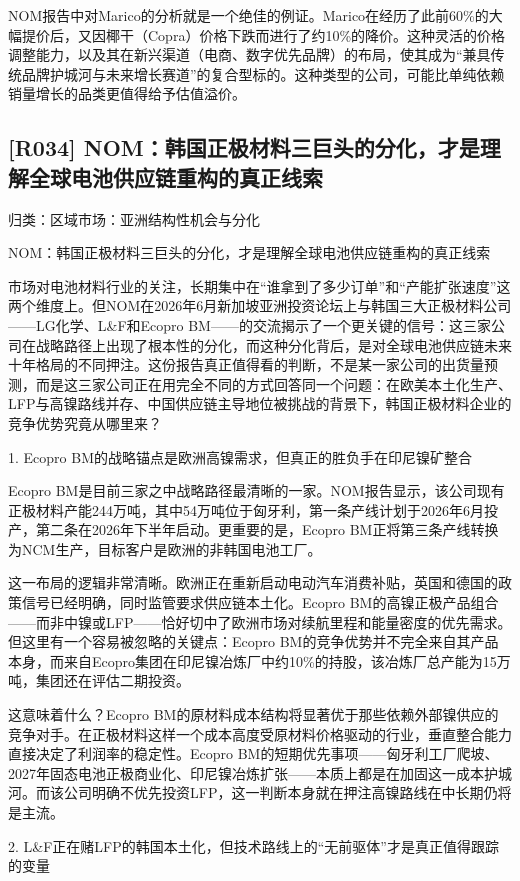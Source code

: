 \documentclass[11pt]{ctexart}
\begin{document}
NOM报告中对Marico的分析就是一个绝佳的例证。Marico在经历了此前60\%的大幅提价后，又因椰干（Copra）价格下跌而进行了约10\%的降价。这种灵活的价格调整能力，以及其在新兴渠道（电商、数字优先品牌）的布局，使其成为“兼具传统品牌护城河与未来增长赛道”的复合型标的。这种类型的公司，可能比单纯依赖销量增长的品类更值得给予估值溢价。

\subsection{[R034] NOM：韩国正极材料三巨头的分化，才是理解全球电池供应链重构的真正线索}
{\small\color{refgray}归类：区域市场：亚洲结构性机会与分化}

NOM：韩国正极材料三巨头的分化，才是理解全球电池供应链重构的真正线索

市场对电池材料行业的关注，长期集中在“谁拿到了多少订单”和“产能扩张速度”这两个维度上。但NOM在2026年6月新加坡亚洲投资论坛上与韩国三大正极材料公司——LG化学、L\&F和Ecopro BM——的交流揭示了一个更关键的信号：这三家公司在战略路径上出现了根本性的分化，而这种分化背后，是对全球电池供应链未来十年格局的不同押注。这份报告真正值得看的判断，不是某一家公司的出货量预测，而是这三家公司正在用完全不同的方式回答同一个问题：在欧美本土化生产、LFP与高镍路线并存、中国供应链主导地位被挑战的背景下，韩国正极材料企业的竞争优势究竟从哪里来？

1. Ecopro BM的战略锚点是欧洲高镍需求，但真正的胜负手在印尼镍矿整合

Ecopro BM是目前三家之中战略路径最清晰的一家。NOM报告显示，该公司现有正极材料产能244万吨，其中54万吨位于匈牙利，第一条产线计划于2026年6月投产，第二条在2026年下半年启动。更重要的是，Ecopro BM正将第三条产线转换为NCM生产，目标客户是欧洲的非韩国电池工厂。

这一布局的逻辑非常清晰。欧洲正在重新启动电动汽车消费补贴，英国和德国的政策信号已经明确，同时监管要求供应链本土化。Ecopro BM的高镍正极产品组合——而非中镍或LFP——恰好切中了欧洲市场对续航里程和能量密度的优先需求。但这里有一个容易被忽略的关键点：Ecopro BM的竞争优势并不完全来自其产品本身，而来自Ecopro集团在印尼镍冶炼厂中约10\%的持股，该冶炼厂总产能为15万吨，集团还在评估二期投资。

这意味着什么？Ecopro BM的原材料成本结构将显著优于那些依赖外部镍供应的竞争对手。在正极材料这样一个成本高度受原材料价格驱动的行业，垂直整合能力直接决定了利润率的稳定性。Ecopro BM的短期优先事项——匈牙利工厂爬坡、2027年固态电池正极商业化、印尼镍冶炼扩张——本质上都是在加固这一成本护城河。而该公司明确不优先投资LFP，这一判断本身就在押注高镍路线在中长期仍将是主流。

2. L\&F正在赌LFP的韩国本土化，但技术路线上的“无前驱体”才是真正值得跟踪的变量
\end{document}
